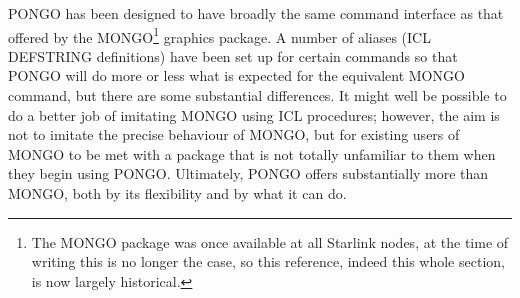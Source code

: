 \documentclass[twoside,11pt]{article}
\renewcommand{\_}{\texttt{\symbol{95}}}
\begin{document}
PONGO has been designed to have broadly the same command interface as
that offered by the MONGO\footnote{The MONGO package was once
available at all Starlink nodes, at the time of writing this is no
longer the case, so this reference, indeed this whole section, is now
largely historical.} graphics package.  A number of aliases (ICL
DEFSTRING definitions) have been set up for certain commands so that
PONGO will do more or less what is expected for the equivalent MONGO
command, but there are some substantial differences.  It might well be
possible to do a better job of imitating MONGO using ICL procedures;
however, the aim is not to imitate the precise behaviour of MONGO, but
for existing users of MONGO to be met with a package that is not
totally unfamiliar to them when they begin using PONGO.  Ultimately,
PONGO offers substantially more than MONGO, both by its flexibility
and by what it can do.
\end{document}
